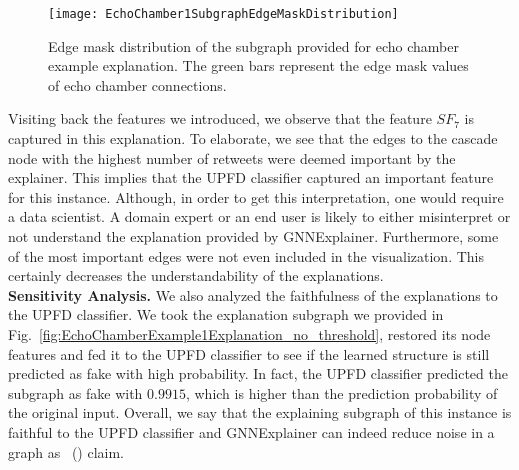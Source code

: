 \begin{figure}
    \centering
    \texttt{[image: EchoChamber1SubgraphEdgeMaskDistribution]}
    \caption[Edge mask distribution of the subgraph provided for echo chamber example explanation.]{Edge mask distribution of the subgraph provided for echo chamber example explanation. The green bars represent the edge mask values of echo chamber connections.}
    \label{fig:EchoChamber1SubgraphEdgeMaskDistribution}
\end{figure}
Visiting back the features we introduced, we observe that the feature $SF_7$ is captured in this explanation. To elaborate, we see that the edges to the cascade node with the highest number of retweets were deemed important by the explainer. This implies that the UPFD classifier captured an important feature for this instance. Although, in order to get this interpretation, one would require a data scientist. A domain expert or an end user is likely to either misinterpret or not understand the explanation provided by GNNExplainer. Furthermore, some of the most important edges were not even included in the visualization. This certainly decreases the understandability of the explanations.\\
\textbf{Sensitivity Analysis.} We also analyzed the faithfulness of the explanations to the UPFD classifier. We took the explanation subgraph we provided in Fig.~\ref{fig:EchoChamberExample1Explanation_no_threshold}, restored its node features and fed it to the UPFD classifier to see if the learned structure is still predicted as fake with high probability. In fact, the UPFD classifier predicted the subgraph as fake with $0.9915$, which is higher than the prediction probability of the original input. Overall, we say that the explaining subgraph of this instance is faithful to the UPFD classifier and GNNExplainer can indeed reduce noise in a graph as~\citeauthor{GNNExplainer_Ying} (\citeyear{GNNExplainer_Ying}) claim.\\
